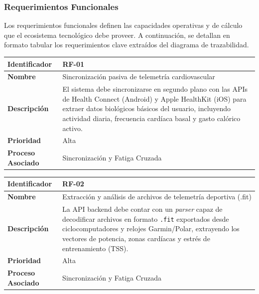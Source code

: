 \documentclass[12pt]{article}
\begin{document}
\subsubsection{Requerimientos Funcionales}
Los requerimientos funcionales definen las capacidades operativas y de cálculo que el ecosistema tecnológico debe proveer. A continuación, se detallan en formato tabular los requerimientos clave extraídos del diagrama de trazabilidad.

\begin{table}[h!]
    \centering
    \renewcommand{\arraystretch}{1.3}
    \begin{tabular}{|p{3.5cm}|p{11.5cm}|}
        \hline
        \rowcolor[HTML]{EFEFEF} 
        \textbf{Identificador} & \textbf{RF-01} \\ \hline
        \textbf{Nombre} & Sincronización pasiva de telemetría cardiovascular \\ \hline
        \textbf{Descripción} & El sistema debe sincronizarse en segundo plano con las APIs de Health Connect (Android) y Apple HealthKit (iOS) para extraer datos biológicos básicos del usuario, incluyendo actividad diaria, frecuencia cardíaca basal y gasto calórico activo. \\ \hline
        \textbf{Prioridad} & Alta \\ \hline
        \textbf{Proceso Asociado} & Sincronización y Fatiga Cruzada \\ \hline
    \end{tabular}
\end{table}

\begin{table}[h!]
    \centering
    \renewcommand{\arraystretch}{1.3}
    \begin{tabular}{|p{3.5cm}|p{11.5cm}|}
        \hline
        \rowcolor[HTML]{EFEFEF} 
        \textbf{Identificador} & \textbf{RF-02} \\ \hline
        \textbf{Nombre} & Extracción y análisis de archivos de telemetría deportiva (.fit) \\ \hline
        \textbf{Descripción} & La API backend debe contar con un \textit{parser} capaz de decodificar archivos en formato \texttt{.fit} exportados desde ciclocomputadores y relojes Garmin/Polar, extrayendo los vectores de potencia, zonas cardíacas y estrés de entrenamiento (TSS). \\ \hline
        \textbf{Prioridad} & Alta \\ \hline
        \textbf{Proceso Asociado} & Sincronización y Fatiga Cruzada \\ \hline
    \end{tabular}
\end{table}
\end{document}

